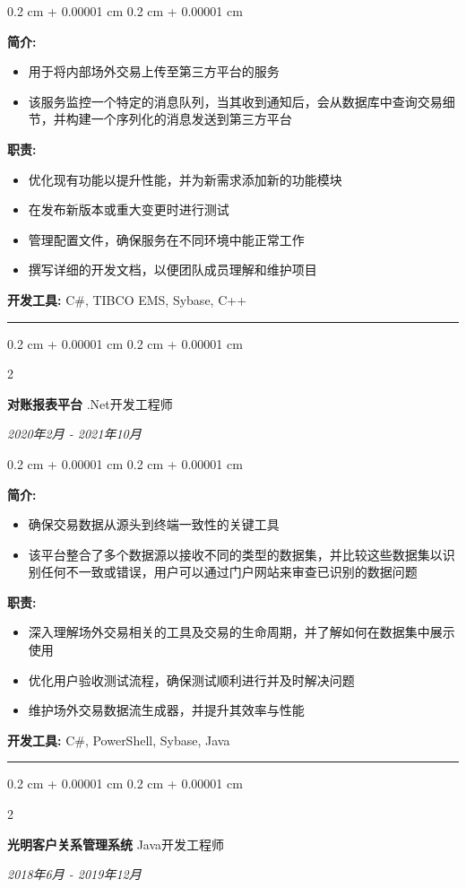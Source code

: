 \documentclass[10pt, letterpaper]{article}
\newenvironment{highlights}{
	\begin{itemize}[
		topsep=0.10 cm,
		parsep=0.10 cm,
		partopsep=0pt,
		itemsep=0pt,
		leftmargin=0.4 cm + 10pt
		]
	}{
	\end{itemize}
} %
\newenvironment{onecolentry}{
	\begin{adjustwidth}{
			0.2 cm + 0.00001 cm
		}{
			0.2 cm + 0.00001 cm
		}
	}{
	\end{adjustwidth}
} %
\newenvironment{twocolentry}[2][]{
	\onecolentry
	\def\secondColumn{#2}
	\setcolumnwidth{\fill, 4.5 cm}
	\begin{paracol}{2}
	}{
		\switchcolumn \raggedleft \secondColumn
	\end{paracol}
	\endonecolentry
} %
\begin{document}
			\vspace{0.10 cm}
			\begin{onecolentry}
				\textbf{简介:} 
				\begin{highlights}
					\item{用于将内部场外交易上传至第三方平台的服务}
					\item{该服务监控一个特定的消息队列，当其收到通知后，会从数据库中查询交易细节，并构建一个序列化的消息发送到第三方平台}
				\end{highlights}
				\textbf{职责:} 
				\begin{highlights}
					\item{优化现有功能以提升性能，并为新需求添加新的功能模块}
					\item{在发布新版本或重大变更时进行测试}
					\item{管理配置文件，确保服务在不同环境中能正常工作}
					\item{撰写详细的开发文档，以便团队成员理解和维护项目}
				\end{highlights}
				\textbf{开发工具:} C\#, TIBCO EMS, Sybase, C++
			\end{onecolentry}
			\vspace{0.4 cm}
			\hrule
			\vspace{0.4 cm}
			
			\begin{twocolentry}{	
				\textit{2020年2月 - 2021年10月}}
				\textbf{对账报表平台}
				\space\space\space\space\space\space\space\space\space\space\space\space .Net开发工程师
			\end{twocolentry}
			
			\vspace{0.10 cm}
			\begin{onecolentry}
				\textbf{简介:} 
				\begin{highlights}
					\item{确保交易数据从源头到终端一致性的关键工具}
					\item{该平台整合了多个数据源以接收不同的类型的数据集，并比较这些数据集以识别任何不一致或错误，用户可以通过门户网站来审查已识别的数据问题}
				\end{highlights} 
				\textbf{职责:} 
				\begin{highlights}
					\item{深入理解场外交易相关的工具及交易的生命周期，并了解如何在数据集中展示使用}
					\item{优化用户验收测试流程，确保测试顺利进行并及时解决问题}
					\item{维护场外交易数据流生成器，并提升其效率与性能}
				\end{highlights}
				\textbf{开发工具:} C\#, PowerShell, Sybase, Java
			\end{onecolentry}
			\vspace{0.4 cm}
			\hrule
			\vspace{0.4 cm}
			\begin{twocolentry}{	
				\textit{2018年6月 - 2019年12月}}
				\textbf{光明客户关系管理系统}
				\space\space\space\space\space\space\space\space\space\space\space\space Java开发工程师
			\end{twocolentry}
			
\end{document}
